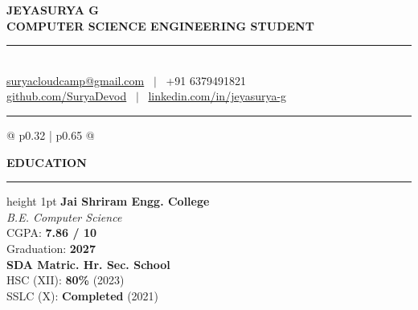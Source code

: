 \documentclass[a4paper,10pt]{article}
\begin{document}
\begin{mdframed}[style=resumebox]

\begin{center}
    {\fontsize{19}{22}\selectfont \textbf{\color{primaryblack} JEYASURYA G}}\\[2pt]
    {\fontsize{9.5}{11}\selectfont \textbf{\color{darkgray} COMPUTER SCIENCE ENGINEERING STUDENT}}\\[3pt]
    \textcolor{primaryblack}{\rule{\textwidth}{1.2pt}}\\[3pt]
    \small
    \href{mailto:suryacloudcamp@gmail.com}{suryacloudcamp@gmail.com} \ $\vert$ \ +91 6379491821\\
    \href{https://github.com/SuryaDevod}{github.com/SuryaDevod} \ $\vert$ \ \href{https://linkedin.com/in/jeyasurya-g}{linkedin.com/in/jeyasurya-g}\\[3pt]
    \textcolor{primaryblack}{\rule{\textwidth}{1.2pt}}
\end{center}

\vspace{-6pt}

\begin{tabularx}{\textwidth}{@{} p{0.32\textwidth} | p{0.65\textwidth} @{}}
\begin{minipage}[t]{\linewidth}
    \textbf{\color{primaryblack}\large EDUCATION}
    \vspace{2pt}\hrule height 1pt\vspace{3pt}
    \textbf{Jai Shriram Engg. College}\\
    \textit{B.E. Computer Science}\\
    CGPA: \textbf{7.86 / 10}\\
    Graduation: \textbf{2027}\\
    \vspace{3pt}\dotfill\vspace{3pt}
    \textbf{SDA Matric. Hr. Sec. School}\\
    HSC (XII): \textbf{80\%} (2023)\\
    SSLC (X): \textbf{Completed} (2021)


\end{minipage}
\end{tabularx}
\end{mdframed}
\end{document}
